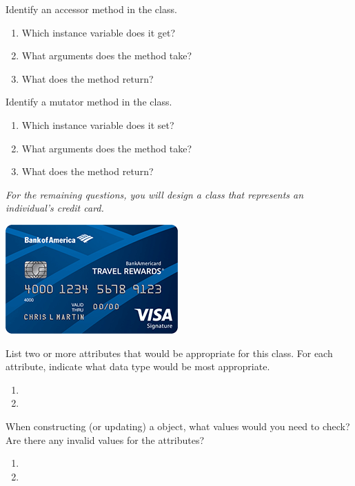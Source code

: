 \Q Identify an accessor method in the  class. 
\begin{enumerate}
\item Which instance variable does it get?
\item What arguments does the method take?
\item What does the method return?
\end{enumerate}


\Q Identify a mutator method in the  class.
\begin{enumerate}
\item Which instance variable does it set?
\item What arguments does the method take?
\item What does the method return?
\end{enumerate}


\begin{center}
\textit{For the remaining questions, you will design a class that represents an individual's credit card.}
\bigskip\par
\includegraphics{CS1B/credit-card.png}
\end{center}


\Q List two or more attributes that would be appropriate for this  class. For each attribute, indicate what data type would be most appropriate.

\begin{enumerate}
\item 
\item 
\end{enumerate}


\Q When constructing (or updating) a  object, what values would you need to check? Are there any invalid values for the attributes?

\begin{enumerate}
\item 
\item 
\end{enumerate}


